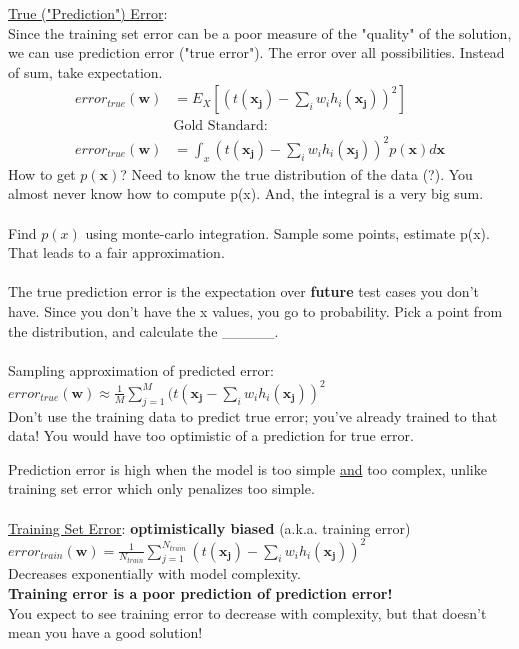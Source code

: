 \underline{True ("Prediction") Error}:   \hfill \\
Since the training set error can be a poor measure of the "quality" of the solution, we can use prediction error ("true error").  
The error over all possibilities.   Instead of sum, take expectation. 
\begin{align*}
	error_{true}(\bm{w}) &= E_X[(t(\bm{x_j})-\sum_{i} w_i h_i(\bm{x_j}))^2] \\
		& \mbox{Gold Standard:} \\
	error_{true}(\bm{w}) &= \int_x (t(\bm{x_j})-\sum_{i} w_i h_i(\bm{x_j}))^2 p(\bm{x}) d\bm{x}
\end{align*}
How to get $p(\bm{x})$?  Need to know the true distribution of the data (?).  
You almost never know how to compute p(x).
And, the integral is a very big sum. \hfill \\  \hfill \\

Find $p(x)$ using monte-carlo integration. 
Sample some points, estimate p(x).  
That leads to a fair approximation.  \hfill \\  \hfill \\

The true prediction error is the expectation over \textbf{future} test cases you don't have.  
Since you don't have the x values, you go to probability. 
Pick a point from the distribution, and calculate the \_\_\_\_\_.     \hfill \\  \hfill \\

Sampling approximation of predicted error: \hfill \\
$\displaystyle error_{true}(\bm{w}) \approx \frac{1}{M} \sum_{j=1}^M(t(\bm{x_j} - \sum_i w_i h_i(\bm{x_j}))^2$  \hfill \\
Don't use the training data to predict true error; you've already trained to that data!  You would have too optimistic of a prediction for true error. 

Prediction error is high when the model is too simple \underline{and} too complex, unlike training set error which only penalizes too simple.  \hfill \\
\hfill \\

\underline{Training Set Error}:  \textbf{optimistically biased}  (a.k.a. training error) \hfill \\
$\displaystyle  error_{train}(\bm{w}) = \frac{1}{N_{train}} \sum_{j=1}^{N_{train}}(t(\bm{x_j})-\sum_{i} w_i h_i(\bm{x_j}))^2$ \hfill \\
Decreases exponentially with model complexity.   \hfill \\
\textbf{Training error is a poor prediction of prediction error!} \hfill \\
You expect to see training error to decrease with complexity, but that doesn't mean you have a good solution!  \hfill \\
\hfill \\  \hfill \\


